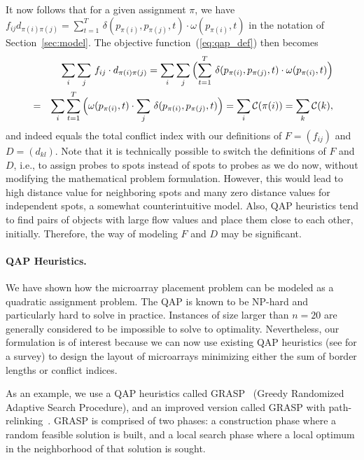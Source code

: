 \documentclass[english]{lni}
\newcommand{\ignore}[1]{}
\begin{document}
It now follows that for a given assignment $\pi$, we have
$f_{ij} d_{\pi(i)\pi(j)} = \sum_{t=1}^T\, \delta(p_{\pi(i)},p_{\pi(j)},t) 
\cdot \omega(p_{\pi(i)},t)$
in the notation of Section~\ref{sec:model}. The objective
function~(\ref{eq:qap_def}) then becomes
\begin{eqnarray*}
  & & \sum_i \sum_j\, f_{ij} \cdot d_{\pi(i)\pi(j)} 
    = \sum_i \sum_j\, \Bigl( \sum_{t=1}^T\,  \delta(p_{\pi(i)},p_{\pi(j)},t)
      \cdot \omega(p_{\pi(i)},t) \Bigr)\\
  &=& \sum_i \sum_{t=1}^T\, \Bigl( \omega(p_{\pi(i)},t)
      \cdot \sum_j\,  \delta(p_{\pi(i)},p_{\pi(j)},t) \Bigr) 
    = \sum_i \mathcal{C}(\pi(i))
    = \sum_k \mathcal{C}(k),\\
\end{eqnarray*}
and indeed equals the total conflict index with our definitions of $F=(f_{ij})$
and $D=(d_{kl})$.
Note that it is technically possible to switch the definitions of $F$
and $D$, i.e., to assign probes to spots instead of spots to probes as we do now, 
without modifying the mathematical problem formulation. 
However, this would lead to high distance value for
neighboring spots and many zero distance values for independent spots, a somewhat
counterintuitive model. Also, QAP heuristics tend to find pairs of objects with
large flow values and place them close to each other, initially. Therefore, the
way of modeling $F$ and $D$ may be significant.

\paragraph{QAP Heuristics.}
We have shown how the microarray placement problem can be modeled as a
quadratic assignment problem.  The QAP is known to be NP-hard and
particularly hard to solve in practice.  Instances of size larger than
$n = 20$ are generally considered to be impossible to solve to
optimality. Nevertheless, our formulation is of interest because we
can now use existing QAP heuristics (see \cite{CELA98} for a survey)
to design the layout of microarrays minimizing either the sum of
border lengths or conflict indices.
\ignore{including approaches based on tabu search, simulated annealing and genetic algorithms}

As an example, we use a QAP heuristics called GRASP~\cite{LI94}
(Greedy Randomized Adaptive Search Procedure), and an improved version
called GRASP with path-relinking~\cite{OLIVEIRA04}.  GRASP is
comprised of two phases: a construction phase where a random feasible
solution is built, and a local search phase where a local optimum in
the neighborhood of that solution is sought.
\end{document}

